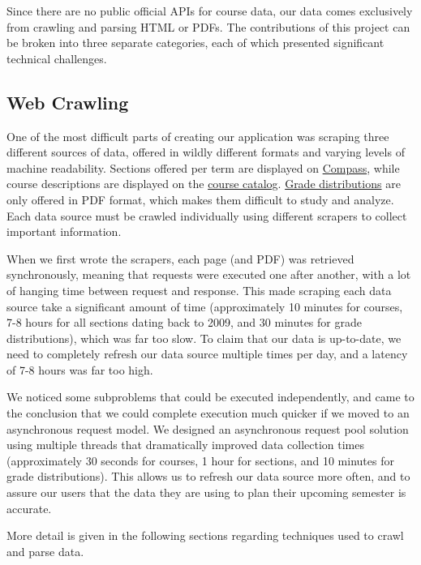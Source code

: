 \documentclass{article}
\begin{document}
Since there are no public official APIs for course data, our data comes exclusively from crawling and parsing HTML or PDFs. The contributions of this project can be broken into three separate categories, each of which presented significant technical challenges.

\subsection{Web Crawling}

One of the most difficult parts of creating our application was scraping three different sources of data, offered in wildly different formats and varying levels of machine readability. Sections offered per term are displayed on \href{https://compass-ssb.tamu.edu/pls/PROD/bwckschd.p_disp_dyn_sched}{Compass}, while course descriptions are displayed on the \href{https://catalog.tamu.edu/undergraduate/course-descriptions/}{course catalog}.  \href{http://web-as.tamu.edu/gradereport/}{Grade distributions} are only offered in PDF format, which makes them difficult to study and analyze. Each data source must be crawled individually using different scrapers to collect important information.

When we first wrote the scrapers, each page (and PDF) was retrieved synchronously, meaning that requests were executed one after another, with a lot of hanging time between request and response. This made scraping each data source take a significant amount of time (approximately 10 minutes for courses, 7-8 hours for all sections dating back to 2009, and 30 minutes for grade distributions), which was far too slow. To claim that our data is up-to-date, we need to completely refresh our data source multiple times per day, and a latency of 7-8 hours was far too high.

We noticed some subproblems that could be executed independently, and came to the conclusion that we could complete execution much quicker if we moved to an asynchronous request model. We designed an asynchronous request pool solution using multiple threads that dramatically improved data collection times (approximately 30 seconds for courses, 1 hour for sections, and 10 minutes for grade distributions). This allows us to refresh our data source more often, and to assure our users that the data they are using to plan their upcoming semester is accurate.

More detail is given in the following sections regarding techniques used to crawl and parse data.
\end{document}
